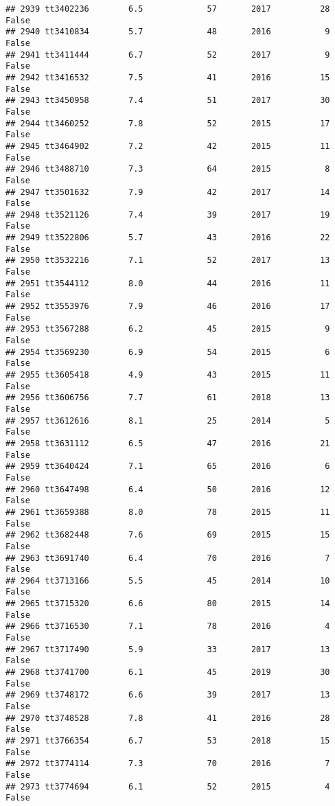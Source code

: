 \documentclass[
]{article}
\begin{document}
\begin{verbatim}
## 2939 tt3402236        6.5             57       2017          28   False
## 2940 tt3410834        5.7             48       2016           9   False
## 2941 tt3411444        6.7             52       2017           9   False
## 2942 tt3416532        7.5             41       2016          15   False
## 2943 tt3450958        7.4             51       2017          30   False
## 2944 tt3460252        7.8             52       2015          17   False
## 2945 tt3464902        7.2             42       2015          11   False
## 2946 tt3488710        7.3             64       2015           8   False
## 2947 tt3501632        7.9             42       2017          14   False
## 2948 tt3521126        7.4             39       2017          19   False
## 2949 tt3522806        5.7             43       2016          22   False
## 2950 tt3532216        7.1             52       2017          13   False
## 2951 tt3544112        8.0             44       2016          11   False
## 2952 tt3553976        7.9             46       2016          17   False
## 2953 tt3567288        6.2             45       2015           9   False
## 2954 tt3569230        6.9             54       2015           6   False
## 2955 tt3605418        4.9             43       2015          11   False
## 2956 tt3606756        7.7             61       2018          13   False
## 2957 tt3612616        8.1             25       2014           5   False
## 2958 tt3631112        6.5             47       2016          21   False
## 2959 tt3640424        7.1             65       2016           6   False
## 2960 tt3647498        6.4             50       2016          12   False
## 2961 tt3659388        8.0             78       2015          11   False
## 2962 tt3682448        7.6             69       2015          15   False
## 2963 tt3691740        6.4             70       2016           7   False
## 2964 tt3713166        5.5             45       2014          10   False
## 2965 tt3715320        6.6             80       2015          14   False
## 2966 tt3716530        7.1             78       2016           4   False
## 2967 tt3717490        5.9             33       2017          13   False
## 2968 tt3741700        6.1             45       2019          30   False
## 2969 tt3748172        6.6             39       2017          13   False
## 2970 tt3748528        7.8             41       2016          28   False
## 2971 tt3766354        6.7             53       2018          15   False
## 2972 tt3774114        7.3             70       2016           7   False
## 2973 tt3774694        6.1             52       2015           4   False

\end{verbatim}
\end{document}
